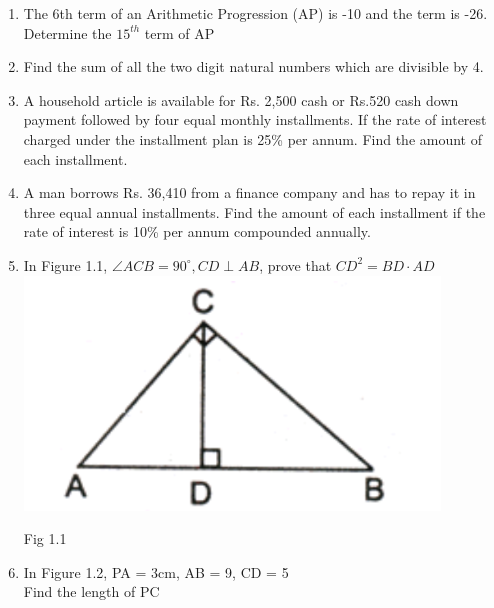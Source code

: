 \documentclass[journal,12pt,twocolumn]{IEEEtran}
\begin{document}
\begin{enumerate}[label=1.\arabic*]
\item The 6th term of an Arithmetic Progression (AP) is -10 and the term is -26. Determine the $15^{th}$ term of AP\\
\item Find the sum of all the two digit natural numbers which are divisible by 4.\\
\item A household article is available for Rs. 2,500 cash or Rs.520 cash down payment followed by four equal monthly installments.
If the rate of interest charged under the installment plan is 25\% per annum. Find the amount of each installment.\\
\item A man borrows Rs. 36,410 from a finance company and has to repay it in three equal annual installments. Find the amount of each
installment if the rate of interest is 10\% per annum compounded annually.\\
\item In Figure 1.1, $\angle{ACB} = 90^\circ , CD \perp AB $, prove that $CD^2 = BD \cdot AD $\\
\includegraphics[scale = 0.75]{fig 1.1}\\
\begin{flushright}
Fig 1.1\\
\end{flushright}
\vspace{2mm}
\item In Figure 1.2, PA = 3cm, AB = 9, CD = 5\\
Find the length of PC\\

\end{enumerate}
\end{document}
